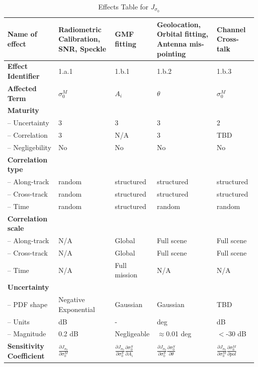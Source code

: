 \begin{table}[h]
	\centering
	\scriptsize %
	\setlength{\tabcolsep}{2pt} %
	\caption{Effects Table for $J_{\sigma_{0}}$}
	
	\begin{tabularx}{\textwidth}{l | X | X | X | X}
		\toprule
		\textbf{Name of effect} & Radiometric Calibration, SNR, Speckle & GMF fitting & Geolocation, Orbital fitting, Antenna mis-pointing & Channel Cross-talk \\
		\midrule
		\textbf{Effect Identifier} & 1.a.1 & 1.b.1 & 1.b.2 & 1.b.3 \\
		\midrule
		\textbf{Affected Term} & $\sigma_{0}^{M}$ & $A_{i}$ & $\theta$ & $\sigma_{0}^{M}$ \\
		\midrule
		\textbf{Maturity} &  &  & & \\
		\quad -- Uncertainty & 3 & 3 & 3 & 2 \\
		\quad -- Correlation & 3 & N/A & 3 & TBD \\
		\quad -- Negligebility & No & No & No & No \\
		\midrule
		\textbf{Correlation type} &  &  & & \\
		\quad -- Along-track & random & structured & structured & structured \\
		\quad -- Cross-track & random & structured & structured & structured \\
		\quad -- Time & random & structured & random & random \\
		\midrule
		\textbf{Correlation scale} &  &  & & \\
		\quad -- Along-track & N/A & Global & Full scene & Full scene \\
		\quad -- Cross-track & N/A & Global & Full scene & Full scene \\
		\quad -- Time & N/A & Full mission & N/A & N/A \\
		\midrule
		\textbf{Uncertainty} & & & & \\
		\quad -- PDF shape & Negative Exponential & Gaussian & Gaussian & TBD \\
		\quad -- Units & dB & - & deg & dB \\
		\quad -- Magnitude & 0.2 dB & Negligeable & $\approx$0.01 deg & $<$-30 dB \\
		\midrule
		\textbf{Sensitivity Coefficient} & $\frac{\partial J_{\sigma_{0}}}{\partial \sigma_{0}^{M}}$ & $\frac{\partial J_{\sigma_{0}}}{\partial \sigma_{0}^{S}} \frac{\partial \sigma_{0}^{S}}{\partial A_{i}}$ & $\frac{\partial J_{\sigma_{0}}}{\partial \sigma_{0}^{S}} \frac{\partial \sigma_{0}^{S}}{\partial \theta}$ & $\frac{\partial J_{\sigma_{0}}}{\partial \sigma_{0}^{M}} \frac{\partial \sigma_{0}^{M}}{\partial pol}$ \\
		\bottomrule
	\end{tabularx}
	\label{tab: effects Js0}
\end{table}

